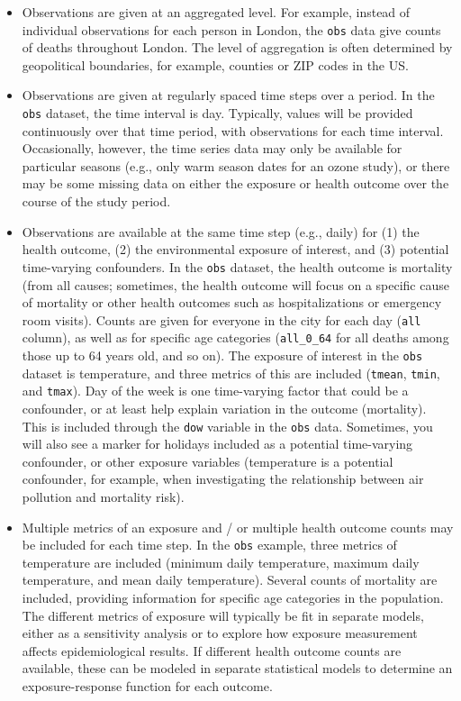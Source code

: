 \documentclass[
]{book}
\providecommand{\tightlist}{%
  \setlength{\itemsep}{0pt}\setlength{\parskip}{0pt}}
\begin{document}
\begin{itemize}
\tightlist
\item
  Observations are given at an aggregated level. For example, instead of
  individual observations for each person in London, the \texttt{obs} data give
  counts of deaths throughout London. The level of aggregation is often determined
  by geopolitical boundaries, for example, counties or ZIP codes in the US.
\item
  Observations are given at regularly spaced time steps over a period. In the
  \texttt{obs} dataset, the time interval is day. Typically, values will be provided
  continuously over that time period, with observations for each time interval.
  Occasionally, however, the time series data may only be available for
  particular seasons (e.g., only warm season dates for an ozone study), or
  there may be some missing data on either the exposure or health outcome over
  the course of the study period.
\item
  Observations are available at the same time step (e.g., daily) for (1) the health outcome, (2) the environmental
  exposure of interest, and (3) potential time-varying confounders. In the \texttt{obs}
  dataset, the health outcome is mortality (from all causes; sometimes, the health
  outcome will focus on a specific cause of mortality or other health outcomes such
  as hospitalizations or emergency room visits). Counts are given for everyone in
  the city for each day (\texttt{all} column), as well as for specific age categories
  (\texttt{all\_0\_64} for all deaths among those up to 64 years old, and so on). The
  exposure of interest in the \texttt{obs} dataset is temperature, and three metrics of
  this are included (\texttt{tmean}, \texttt{tmin}, and \texttt{tmax}). Day of the week is one
  time-varying factor that could be a confounder, or at least help explain
  variation in the outcome (mortality). This is included through the \texttt{dow} variable
  in the \texttt{obs} data. Sometimes, you will also see a marker for holidays included
  as a potential time-varying confounder, or other exposure variables (temperature
  is a potential confounder, for example, when investigating the relationship
  between air pollution and mortality risk).
\item
  Multiple metrics of an exposure and / or multiple health outcome counts
  may be included for each time step. In the \texttt{obs} example, three metrics of
  temperature are included (minimum daily temperature, maximum daily temperature,
  and mean daily temperature). Several counts of mortality are included, providing
  information for specific age categories in the population. The different metrics
  of exposure will typically be fit in separate models, either as a sensitivity
  analysis or to explore how exposure measurement affects epidemiological results.
  If different health outcome counts are available, these can be modeled in separate
  statistical models to determine an exposure-response function for each outcome.
\end{itemize}
\end{document}
